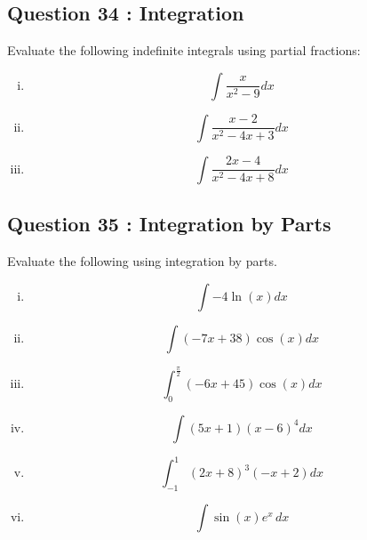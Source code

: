 \documentclass[]{article}
\begin{document}
\subsection*{Question 34 : Integration}
Evaluate the following indefinite integrals using partial fractions:
\begin{multicols}{2}
	\begin{enumerate}[(i)]
		
		\item \[ \int \frac{x}{x^2-9} dx  \]
		
		\item \[ \int \frac{x-2}{x^2 - 4x + 3} dx  \]
		
		\item \[ \int \frac{2x-4}{x^2 - 4x + 8} dx  \]
		
	\end{enumerate}
\end{multicols}


\subsection*{Question 35 : Integration by Parts}
Evaluate the following using integration by parts.

\begin{multicols}{2}
	\begin{enumerate}[(i)]
		\item \[ \int -4\ln\left(x\right)dx\]
		
		\item \[ \int\left(-7x+38\right)\cos\left(x\right)dx\]
		
		\item  \[\int_0^\frac{\pi}{2}\left(-6x+45\right)\cos\left(x\right)dx\]
		
		
		\item \[ \int\left(5x+1\right)\left(x-6\right)^4 dx\]
		
		
		\item \[ \int_{-1}^1 \left(2x+8\right)^3\left(-x+2\right)dx\]
		
		
		\item \[ \int \sin\left(x\right) e^x\, dx \] 
	\end{enumerate}
\end{multicols}
\end{document}
